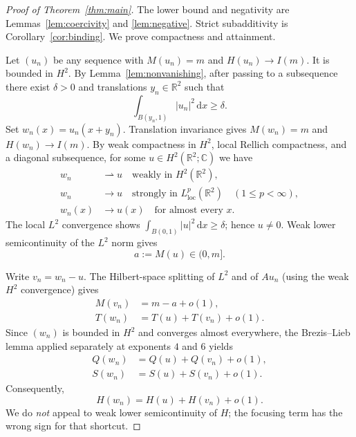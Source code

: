 \documentclass[11pt]{article}
\numberwithin{equation}{section}
\theoremstyle{remark}
\newcommand{\R}{\mathbb{R}}
\newcommand{\C}{\mathbb{C}}
\newcommand{\dd}{\,\mathrm{d}}
\newcommand{\abs}[1]{\left\lvert #1\right\rvert}
\begin{document}
\begin{proof}[Proof of Theorem~\ref{thm:main}]
The lower bound and negativity are Lemmas~\ref{lem:coercivity}
and \ref{lem:negative}.  Strict subadditivity is
Corollary~\ref{cor:binding}.  We prove compactness and attainment.

Let $(u_n)$ be any sequence with $M(u_n)=m$ and $H(u_n)\to I(m)$.
It is bounded in $H^2$. By Lemma~\ref{lem:nonvanishing}, after passing to a
subsequence there exist $\delta>0$ and translations $y_n\in\R^2$ such that
\[
\int_{B(y_n,1)}\abs{u_n}^2\dd x\ge\delta.
\]
Set $w_n(x)=u_n(x+y_n)$.  Translation invariance gives
$M(w_n)=m$ and $H(w_n)\to I(m)$.
By weak compactness in $H^2$, local Rellich compactness, and a diagonal
subsequence, for some $u\in H^2(\R^2;\C)$ we have
\begin{equation}\label{eq:weak}
\begin{split}
w_n&\rightharpoonup u\quad\text{weakly in }H^2(\R^2),\\
w_n&\to u\quad\text{strongly in }L^p_{\mathrm{loc}}(\R^2)
\quad(1\le p<\infty),\\
w_n(x)&\to u(x)\quad\text{for almost every }x.
\end{split}
\end{equation}
The local $L^2$ convergence shows
$\int_{B(0,1)}\abs{u}^2\dd x\ge\delta$; hence $u\ne0$.
Weak lower semicontinuity of the $L^2$ norm gives
\begin{equation}\label{eq:a}
a:=M(u)\in(0,m].
\end{equation}

Write $v_n=w_n-u$.  The Hilbert-space splitting of $L^2$ and of
$Au_n$ (using the weak $H^2$ convergence) gives
\begin{align}
M(v_n)&=m-a+o(1),\label{eq:masssplit}\\
T(w_n)&=T(u)+T(v_n)+o(1).\label{eq:Tsplit}
\end{align}
Since $(w_n)$ is bounded in $H^2$ and converges almost everywhere,
the Brezis--Lieb lemma \cite{brezislieb} applied separately at exponents
$4$ and $6$ yields
\begin{align}
Q(w_n)&=Q(u)+Q(v_n)+o(1),\label{eq:Qsplit}\\
S(w_n)&=S(u)+S(v_n)+o(1).\label{eq:Ssplit}
\end{align}
Consequently,
\begin{equation}\label{eq:Hsplit}
H(w_n)=H(u)+H(v_n)+o(1).
\end{equation}
We do \emph{not} appeal to weak lower semicontinuity of $H$; the focusing
term has the wrong sign for that shortcut.


\end{proof}
\end{document}
